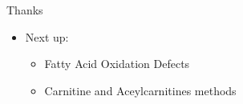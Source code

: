 \documentclass[presentation, smaller]{beamer}
\begin{document}
\begin{frame}[label={sec:orgheadline19}]{Thanks}
\begin{itemize}
\item Next up:
\begin{itemize}
\item Fatty Acid Oxidation Defects
\item Carnitine and Aceylcarnitines methods
\end{itemize}
\end{itemize}
\end{frame}
\end{document}
